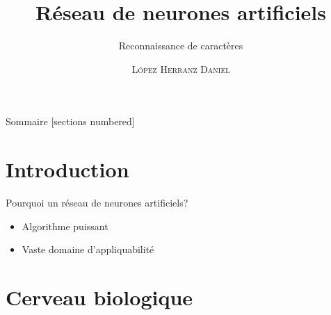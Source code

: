 \documentclass[10pt]{beamer}
\title{R\'eseau de neurones artificiels}
\subtitle{Reconnaissance de caract\`eres}
\date{}
\author{\textsc{L\'opez Herranz Daniel}}
\institute{Lyc\'ee Saint-Louis}
\begin{document}
\maketitle

\begin{frame}{Sommaire}
  [sections numbered]
  \tableofcontents[hideallsubsections]
\end{frame}

\section{Introduction}

\begin{frame}[fragile]{Pourquoi un r\'eseau de neurones artificiels?}
	\begin{itemize}
		\item Algorithme puissant
		\item Vaste domaine d'appliquabilit\'e
	\end{itemize}
\end{frame}

\section{Cerveau biologique}
\end{document}
